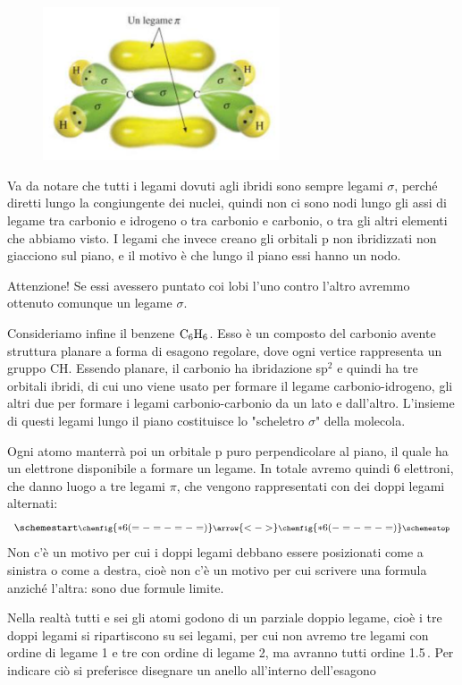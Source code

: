 \begin{figure}[htp]
    \centering
    \includegraphics[width=7cm]{immagini/etene.png}
\end{figure}

Va da notare che tutti i legami dovuti agli ibridi sono sempre legami $\sigma$, perché diretti lungo la congiungente dei nuclei, quindi non ci sono nodi lungo gli assi di legame tra carbonio e idrogeno o tra carbonio e carbonio, o tra gli altri elementi che abbiamo visto. I legami che invece creano gli orbitali p non ibridizzati non giacciono sul piano, e il motivo è che lungo il piano essi hanno un nodo.

Attenzione! Se essi avessero puntato coi lobi l'uno contro l'altro avremmo ottenuto comunque un legame $\sigma$.

\vspace{0.2cm}Consideriamo infine il benzene $\rm C_6H_6$. Esso è un composto del carbonio avente struttura planare a forma di esagono regolare, dove ogni vertice rappresenta un gruppo CH. Essendo planare, il carbonio ha ibridazione sp$^2$ e quindi ha tre orbitali ibridi, di cui uno viene usato per formare il legame carbonio-idrogeno, gli altri due per formare i legami carbonio-carbonio da un lato e dall'altro. L'insieme di questi legami lungo il piano costituisce lo "scheletro $\sigma$" della molecola.

Ogni atomo manterrà poi un orbitale p puro perpendicolare al piano, il quale ha un elettrone disponibile a formare un legame. In totale avremo quindi 6 elettroni, che danno luogo a tre legami $\pi$, che vengono rappresentati con dei doppi legami alternati:
$$
\schemestart
\footnotesize\chemfig{*6(=-=-=-=)}
\arrow{<->}
\footnotesize\chemfig{*6(-=-=-=)}
\schemestop
$$
Non c'è un motivo per cui i doppi legami debbano essere posizionati come a sinistra o come a destra, cioè non c'è un motivo per cui scrivere una formula anziché l'altra: sono due formule limite.

Nella realtà tutti e sei gli atomi godono di un parziale doppio legame, cioè i tre doppi legami si ripartiscono su sei legami, per cui non avremo tre legami con ordine di legame 1 e tre con ordine di legame 2, ma avranno tutti ordine 1.5\,. Per indicare ciò si preferisce disegnare un anello all'interno dell'esagono
  
